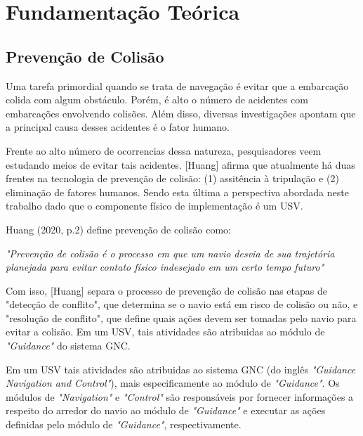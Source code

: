 \chapter{\label{chap:chap2}Fundamentação Teórica}


\section{Prevenção de Colisão}
Uma tarefa primordial quando se trata de navegação é evitar que a embarcação colida com algum obstáculo. Porém, é alto o número de acidentes com embarcações envolvendo colisões. Além disso, diversas investigações apontam que a principal causa desses acidentes é o fator humano.

Frente ao alto número de ocorrencias dessa natureza, pesquisadores veem estudando meios de evitar tais acidentes. [Huang] afirma que atualmente há duas frentes na tecnologia de prevenção de colisão: (1) assitência à tripulação e (2) eliminação de fatores humanos. Sendo esta última a perspectiva abordada neste trabalho dado que o componente físico de implementação é um USV.

Huang (2020, p.2) define prevenção de colisão como:
\begin{directcite}
    \textit{"Prevenção de colisão é o processo em que um navio desvia de sua trajetória planejada para evitar contato físico indesejado em um certo tempo futuro"}
\end{directcite}

Com isso, [Huang] separa o processo de prevenção de colisão nas etapas de "detecção de conflito", que determina se o navio está em risco de colisão ou não, e "resolução de conflito", que define quais ações devem ser tomadas pelo navio para evitar a colisão. Em um USV, tais atividades são atribuidas ao módulo de \textit{"Guidance"} do sistema GNC.


Em um USV tais atividades são atribuidas ao sistema GNC (do inglês \textit{"Guidance Navigation and Control"}), mais especificamente ao módulo de \textit{"Guidance"}. Os módulos de \textit{"Navigation"} e \textit{"Control"} são responsáveis por fornecer informações a respeito do arredor do navio ao módulo de \textit{"Guidance"} e executar as ações definidas pelo módulo de \textit{"Guidance"}, respectivamente.

